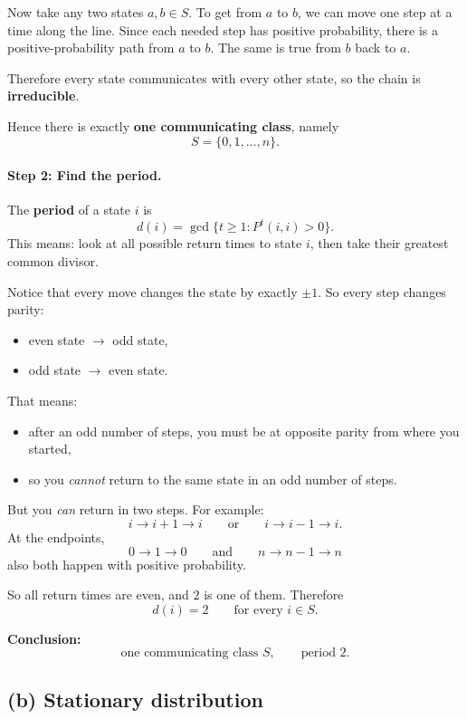 \documentclass[11pt]{article}
\begin{document}
Now take any two states $a,b\in S$.
To get from $a$ to $b$, we can move one step at a time along the line.
Since each needed step has positive probability, there is a positive-probability path from $a$ to $b$.
The same is true from $b$ back to $a$.

Therefore every state communicates with every other state, so the chain is \textbf{irreducible}.

Hence there is exactly \textbf{one communicating class}, namely
\[
S=\{0,1,\dots,n\}.
\]

\paragraph{Step 2: Find the period.}

The \textbf{period} of a state $i$ is
\[
d(i)=\gcd\{t\ge 1 : P^t(i,i)>0\}.
\]
This means: look at all possible return times to state $i$, then take their greatest common divisor.

Notice that every move changes the state by exactly $\pm 1$.
So every step changes parity:
\begin{itemize}[leftmargin=1.5em]
    \item even state $\to$ odd state,
    \item odd state $\to$ even state.
\end{itemize}

That means:
\begin{itemize}[leftmargin=1.5em]
    \item after an odd number of steps, you must be at opposite parity from where you started,
    \item so you \emph{cannot} return to the same state in an odd number of steps.
\end{itemize}

But you \emph{can} return in two steps. For example:
\[
i \to i+1 \to i
\qquad \text{or} \qquad
i \to i-1 \to i.
\]
At the endpoints,
\[
0\to 1\to 0
\qquad \text{and} \qquad
n\to n-1\to n
\]
also both happen with positive probability.

So all return times are even, and $2$ is one of them.
Therefore
\[
d(i)=2 \qquad \text{for every } i\in S.
\]

\bigskip
\noindent
\textbf{Conclusion:}
\[
\text{one communicating class } S, \qquad \text{period } 2.
\]

\subsection*{(b) Stationary distribution}
\end{document}
